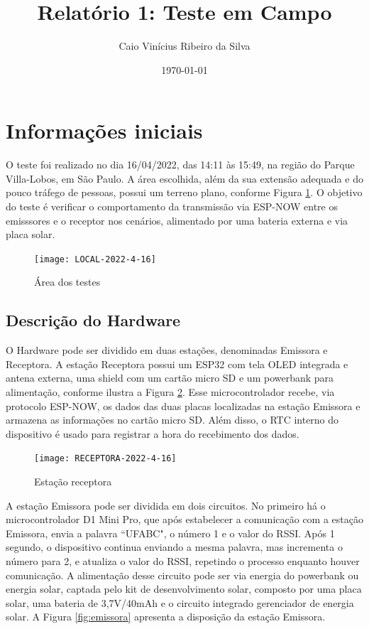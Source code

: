 \documentclass[11pt,a4paper]{article}
\title {Relatório 1: Teste em Campo}
\author{Caio Vinícius Ribeiro da Silva}
\date{\today}
\begin{document}
\maketitle

\section{Informações iniciais}

O teste foi realizado no dia 16/04/2022, das 14:11 às 15:49, na região do Parque Villa-Lobos, em São Paulo. A área escolhida, além da sua extensão adequada e do pouco tráfego de pessoas, possui um terreno plano, conforme Figura \ref{fig:area}. O objetivo do teste é verificar o comportamento da transmissão via ESP-NOW entre os emisssores e o receptor nos cenários, alimentado por uma bateria externa e via placa solar.



\begin{figure}[hbt]
	\centering
		\caption{Área dos testes}
		\texttt{[image: LOCAL-2022-4-16]} 
		\label{fig:area} 
\end{figure}



\subsection{Descrição do Hardware}

O Hardware pode ser dividido em duas estações, denominadas Emissora e Receptora. A estação Receptora possui um ESP32 com tela OLED integrada e antena externa, uma shield com um cartão micro SD e um powerbank para alimentação, conforme ilustra a Figura \ref{fig:receptora}. Esse microcontrolador recebe, via protocolo ESP-NOW, os dados das duas placas localizadas na estação Emissora e armazena as informações no cartão micro SD. Além disso, o RTC interno do dispositivo é usado para registrar a hora do recebimento dos dados. 
%
\begin{figure}[hbt]
	\centering
		\caption{Estação receptora}
		\texttt{[image: RECEPTORA-2022-4-16]} 
		\label{fig:receptora} 

\end{figure} 

A estação Emissora pode ser dividida em dois circuitos. No primeiro há o microcontrolador D1 Mini Pro, que após estabelecer a comunicação com a estação Emissora, envia a palavra ``UFABC", o número 1 e o valor do RSSI. Após 1 segundo, o dispositivo continua enviando a mesma palavra, mas incrementa o número para 2, e atualiza o valor do RSSI, repetindo o processo enquanto houver comunicação. A alimentação desse circuito pode ser via energia do powerbank ou energia solar, captada pelo kit de desenvolvimento solar, composto por uma placa solar, uma bateria de 3,7V/40mAh e o circuito integrado gerenciador de energia solar. A Figura \ref{fig:emissora} apresenta a disposição da estação Emissora.
\end{document}
